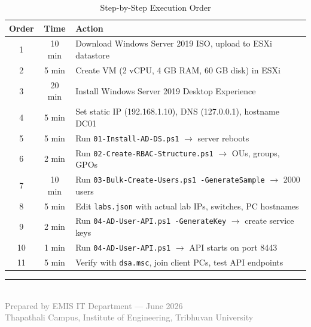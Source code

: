 ﻿\documentclass[12pt,a4paper]{article}
\begin{document}
\begin{table}[H]
\centering
\begin{tabularx}{\textwidth}{c c X}
\toprule
\textbf{Order} & \textbf{Time} & \textbf{Action} \\
\midrule
1  & 10 min  & Download Windows Server 2019 ISO, upload to ESXi datastore \\
2  & 5 min   & Create VM (2 vCPU, 4 GB RAM, 60 GB disk) in ESXi \\
3  & 20 min  & Install Windows Server 2019 Desktop Experience \\
4  & 5 min   & Set static IP (192.168.1.10), DNS (127.0.0.1), hostname DC01 \\
5  & 5 min   & Run \texttt{01-Install-AD-DS.ps1} $\rightarrow$ server reboots \\
6  & 2 min   & Run \texttt{02-Create-RBAC-Structure.ps1} $\rightarrow$ OUs, groups, GPOs \\
7  & 10 min  & Run \texttt{03-Bulk-Create-Users.ps1 -GenerateSample} $\rightarrow$ 2000 users \\
8  & 5 min   & Edit \texttt{labs.json} with actual lab IPs, switches, PC hostnames \\
9  & 2 min   & Run \texttt{04-AD-User-API.ps1 -GenerateKey} $\rightarrow$ create service keys \\
10 & 1 min   & Run \texttt{04-AD-User-API.ps1} $\rightarrow$ API starts on port 8443 \\
11 & 5 min   & Verify with \texttt{dsa.msc}, join client PCs, test API endpoints \\
\bottomrule
\end{tabularx}
\caption{Step-by-Step Execution Order}
\end{table}

\vfill
\begin{center}
\textcolor{emisblue}{\rule{0.4\textwidth}{1pt}}\\[10pt]
{\small\textcolor{gray}{Prepared by EMIS IT Department --- June 2026}}\\
{\small\textcolor{gray}{Thapathali Campus, Institute of Engineering, Tribhuvan University}}
\end{center}
\end{document}

